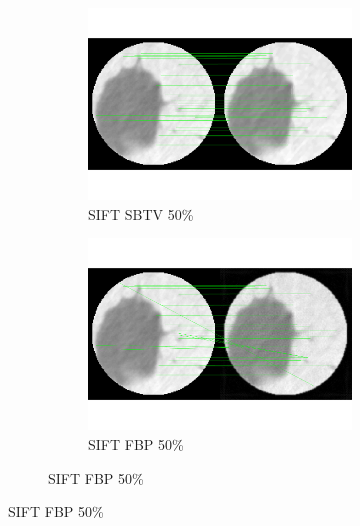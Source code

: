 \documentclass[10pt,a4paper,titlepage]{article}
\begin{document}
\begin{figure}
\begin{figure}[H]
			\begin{subfigure}[b]{0.475\textwidth}
				\includegraphics[width=\textwidth]{Sample1/SIFT/SB/50p.png}
				\caption{SIFT SBTV 50\%}
			\end{subfigure}
			\begin{subfigure}[b]{0.475\textwidth}
				\includegraphics[width=\textwidth]{Sample1/SIFT/FBP/50p.png}
				\caption{SIFT FBP 50\%}
			\end{subfigure}
			

\end{figure}
\end{figure}
\end{document}
